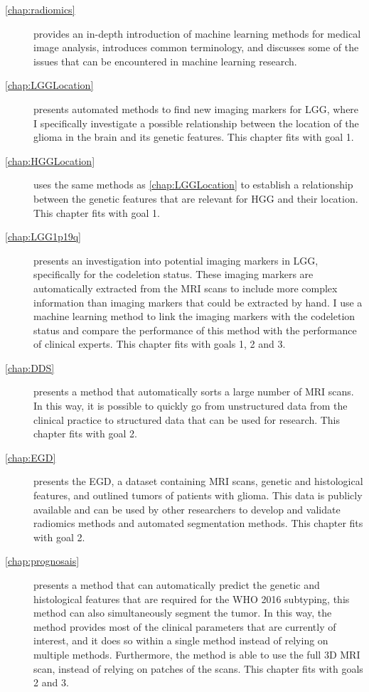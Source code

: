 \begin{description}
    \item[\cref{chap:radiomics}] provides an in-depth introduction of machine learning methods for medical image analysis, introduces common terminology, and discusses some of the issues that can be encountered in machine learning research.

    \item[\cref{chap:LGGLocation}] presents automated methods to find new imaging markers for \gls{LGG}, where I specifically investigate a possible relationship between the location of the \gls{glioma} in the brain and its genetic features.
    This chapter fits with goal 1.

    \item[\cref{chap:HGGLocation}] uses the same methods as \cref{chap:LGGLocation} to establish a relationship between the genetic features that are relevant for \gls{HGG} and their location.
    This chapter fits with goal 1.

    \item[\cref{chap:LGG1p19q}] presents an investigation into potential imaging markers in \gls{LGG}, specifically for the \gls{codeletion} status.
    These imaging markers are automatically extracted from the \gls{MRI} scans to include more complex information than imaging markers that could be extracted by hand.
    I use a machine learning method to link the imaging markers with the \gls{codeletion} status and compare the performance of this method with the performance of clinical experts.
    This chapter fits with goals 1, 2 and 3.

    \item[\cref{chap:DDS}] presents a method that automatically sorts a large number of \gls{MRI} scans.
    In this way, it is possible to quickly go from unstructured data from the clinical practice to structured data that can be used for research.
    This chapter fits with goal 2.

    \item[\cref{chap:EGD}] presents the \gls{EGD}, a dataset containing \gls{MRI} scans, genetic and histological features, and outlined \glspl{tumor} of patients with glioma.
    This data is publicly available and can be used by other researchers to develop and validate radiomics methods and automated segmentation methods.
    This chapter fits with goal 2.

    \item[\cref{chap:prognosais}] presents a method that can automatically predict the genetic and histological features that are required for the \gls{WHO} 2016 subtyping, this method can also simultaneously segment the \gls{tumor}.
    In this way, the method provides most of the clinical parameters that are currently of interest, and it does so within a single method instead of relying on multiple methods.
    Furthermore, the method is able to use the full 3D \gls{MRI} scan, instead of relying on patches of the scans.
    This chapter fits with goals 2 and 3.




\end{description}
